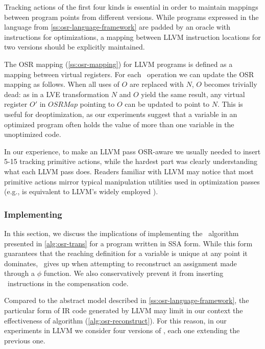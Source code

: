 Tracking actions of the first four kinds is essential in order to maintain mappings between program points from different versions.
While programs expressed in the language from \mysection\ref{ss:osr-language-framework} are padded by an oracle with  instructions for optimizations, a mapping between LLVM instruction locations for two versions should be explicitly maintained.

The OSR mapping (\mysection\ref{ss:osr-mapping}) for LLVM programs is defined as a mapping between virtual registers. For each \RAUWfull\ operation we can update the OSR mapping as follows. When all uses of $O$ are replaced with $N$, $O$ becomes trivially dead: as in a LVE transformation $N$ and $O$ yield the same result, any virtual register $O'$ in $OSRMap$ pointing to $O$ can be updated to point to $N$. This is useful for deoptimization, as our experiments suggest that a variable in an optimized program often holds the value of more than one variable in the unoptimized code.

In our experience, to make an LLVM pass OSR-aware we usually needed to insert 5-15 tracking primitive actions, while the hardest part was clearly understanding what each LLVM pass does. Readers familiar with LLVM may notice that most primitive actions mirror typical manipulation utilities used in optimization passes (e.g.,  is equivalent to LLVM's widely employed ).

\subsubsection*{Implementing }

In this section, we discuss the implications of implementing the \buildcomp\ algorithm presented in \myalgorithm\ref{alg:osr-trans} for a program written in SSA form. While this form guarantees that the reaching definition for a variable is unique at any point it dominates, \reconstruct\ gives up when attempting to reconstruct an assignment made through a $\phi$ function. We also conservatively prevent it from inserting \load\ instructions in the compensation code.

Compared to the abstract model described in \mysection\ref{ss:osr-language-framework}, the particular form of IR code generated by LLVM may limit in our context the effectiveness of algorithm \reconstruct(\myalgorithm\ref{alg:osr-reconstruct}). For this reason, in our experiments in LLVM we consider four versions of \reconstruct, each one extending the previous one.

